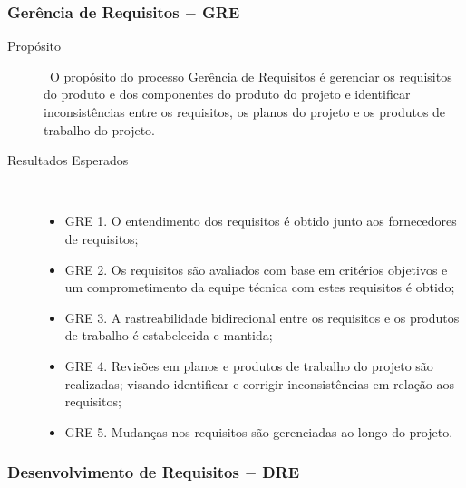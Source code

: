 \subsubsection{Gerência de Requisitos $-$ GRE}

  \begin{description}
    \item[Propósito] \
      O propósito do processo Gerência de Requisitos é gerenciar os requisitos do
      produto e dos componentes do produto do projeto e identificar inconsistências
      entre os requisitos, os planos do projeto e os produtos de trabalho do projeto.
    \item [Resultados Esperados] \
      \begin{itemize}
        \item GRE 1. O entendimento dos requisitos é obtido junto aos fornecedores de requisitos;
        \item GRE 2. Os requisitos são avaliados com base em critérios objetivos e um comprometimento
              da equipe técnica com estes requisitos é obtido;
        \item GRE 3. A rastreabilidade bidirecional entre os requisitos e os produtos de trabalho
              é estabelecida e mantida;
        \item GRE 4. Revisões em planos e produtos de trabalho do projeto são realizadas;
              visando identificar e corrigir inconsistências em relação aos requisitos;
        \item GRE 5. Mudanças nos requisitos são gerenciadas ao longo do projeto.
      \end{itemize}
    \end{description}

\subsubsection{Desenvolvimento de Requisitos $-$ DRE}

